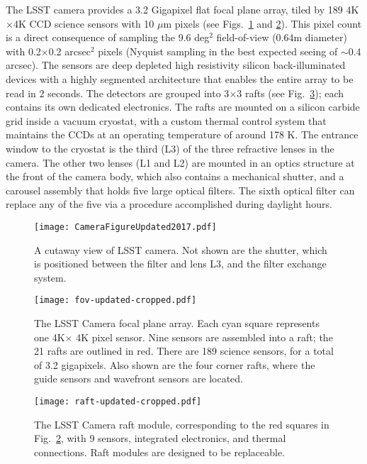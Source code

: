 The LSST camera provides a 3.2 Gigapixel flat focal plane array, tiled by 189
4K$\times$4K CCD science sensors with 10 $\mu$m pixels (see Figs.~\ref{Fig:camera}
and \ref{Fig:fov}). This pixel count is a direct consequence of sampling the
9.6 deg$^2$ field-of-view (0.64m diameter) with 0.2$\times$0.2 arcsec$^2$
pixels (Nyquist sampling in the best expected seeing of $\sim$0.4 arcsec).
The sensors are deep depleted high resistivity silicon back-illuminated devices with
a highly segmented architecture that enables the entire array to be read in 2 seconds.
The detectors are grouped into 3$\times$3 rafts (see Fig.~\ref{Fig:raft}); each
contains its own dedicated electronics. The rafts are mounted on a silicon carbide
grid inside a vacuum cryostat, with a custom thermal control system that maintains
the CCDs at an operating temperature of around 178 K. The entrance window to the
cryostat is the third (L3) of the three refractive lenses in the camera. The other
two lenses (L1 and L2) are mounted in an optics structure at the front of the camera
body, which also contains a mechanical shutter, and a carousel assembly that holds
five large optical filters. The sixth optical filter can
replace any of the five via a procedure accomplished during daylight hours.



\begin{figure}[t!]
\texttt{[image: CameraFigureUpdated2017.pdf]}
\caption{A cutaway view of LSST camera. Not shown are the shutter, which is positioned between the filter and lens L3, and the filter exchange system.}
\label{Fig:camera}
\end{figure}


\begin{figure}[ht]
\texttt{[image: fov-updated-cropped.pdf]}
\caption{The LSST Camera focal plane array. Each cyan square represents one
4K$\times$ 4K pixel sensor. Nine sensors are assembled into a
raft; the 21 rafts are outlined in red. There are 189 science sensors, for a total of 3.2 gigapixels. Also shown are the four corner rafts, where the guide sensors and wavefront sensors are located.}
\label{Fig:fov}
\end{figure}

\begin{figure}[ht]
\texttt{[image: raft-updated-cropped.pdf]}
\caption{The LSST Camera raft module, corresponding to the red squares
in Fig.~\ref{Fig:fov}, with 9 sensors, integrated electronics,
and thermal connections. Raft modules are designed to be replaceable.}
\label{Fig:raft}
\end{figure}



